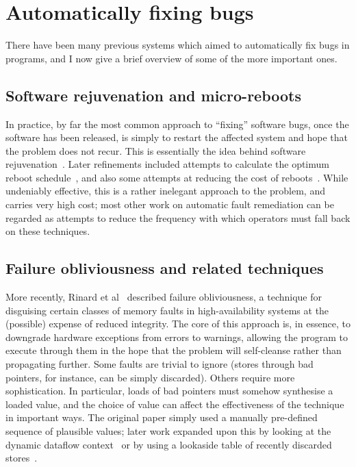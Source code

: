 \section{Automatically fixing bugs}

There have been many previous systems which aimed to automatically fix
bugs in programs, and I now give a brief overview of some of the more
important ones.

\subsection{Software rejuvenation and micro-reboots}

In practice, by far the most common approach to ``fixing'' software
bugs, once the software has been released, is simply to restart the
affected system and hope that the problem does not recur.  This is
essentially the idea behind software rejuvenation~\cite{Huang1995}.
Later refinements included attempts to calculate the optimum reboot
schedule~\cite{FFFGarg1998,Li2002,Vaidyanathan2001}, and also some
attempts at reducing the cost of
reboots~\cite{Candea2002,Patterson2002}.  While undeniably effective,
this is a rather inelegant approach to the problem, and carries very
high cost; most other work on automatic fault remediation can be
regarded as attempts to reduce the frequency with which operators must
fall back on these techniques.

\subsection{Failure obliviousness and related techniques}
More recently, Rinard et al~\cite{FFFRinard2004} described failure
obliviousness, a technique for disguising certain classes of memory
faults in high-availability systems at the (possible) expense of
reduced integrity.  The core of this approach is, in essence, to
downgrade hardware exceptions from errors to warnings, allowing the
program to execute through them in the hope that the problem will
self-cleanse rather than propagating further.  Some faults are trivial
to ignore (stores through bad pointers, for instance, can be simply
discarded).  Others require more sophistication.  In particular, loads
of bad pointers must somehow synthesise a loaded value, and the choice
of value can affect the effectiveness of the technique in important
ways.  The original paper simply used a manually pre-defined sequence
of plausible values; later work expanded upon this by looking at the
dynamic dataflow context~\cite{Nagarajan2009} or by using a lookaside
table of recently discarded stores~\cite{Rinard2005a}.

